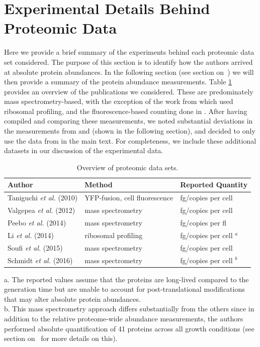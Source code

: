 \section{Experimental Details Behind Proteomic Data}
\label{sec:SI_exp_summary}
Here we provide a brief summary of the experiments behind each proteomic data
set considered. The purpose of this section is to identify how the authors
arrived at absolute protein abundances. In the following section
(see section on~) we will then provide a summary of the
protein abundance measurements. Table \ref{tab:datasets} provides an overview of
the publications we considered. These are predominately mass spectrometry-based,
with the exception of the work from \cite{li2014} which used ribosomal
profiling, and the fluorescence-based counting done in \cite{taniguchi2010}.
After having compiled and comparing these  measurements, we noted substantial
deviations in the measurements from \cite{taniguchi2010} and \cite{soufi2015}
(shown in the following section), and decided to only use the data from
\cite{taniguchi2010, li2014, valgepea2013, peebo2015} in the main text. For
completeness, we include these additional datasets in our discussion of the experimental
data.

\begin{table}[bt]
\caption{\label{tab:datasets}Overview of proteomic data sets.}
\begin{tabular}{l l l }
\toprule
Author & Method & Reported Quantity \\
\midrule
Taniguchi \textit{et al.} (2010)  & YFP-fusion, cell fluorescence    & fg/copies per cell      \\
Valgepea \textit{et al.} (2012)   & mass spectrometry                & fg/copies per cell      \\
Peebo \textit{et al.} (2014)      & mass spectrometry                & fg/copies per fl        \\
Li \textit{et al.} (2014)         & ribosomal profiling              & fg/copies per cell $^a$ \\
Soufi \textit{et al.} (2015)      & mass spectrometry                & fg/copies per cell      \\
Schmidt \textit{et al.} (2016)    & mass spectrometry                & fg/copies per cell $^b$ \\
\bottomrule
\end{tabular}

\medskip
a. The reported values assume that the proteins are long-lived compared to the
generation time but are unable to account for post-translational modifications
that may alter absolute protein abundances.
\\
b. This mass spectrometry approach differs substantially from the others since
in addition to the relative proteome-wide abundance measurements, the authors
performed absolute quantification of 41 proteins across all growth conditions
(see section on~ for more details on this).
\end{table}

